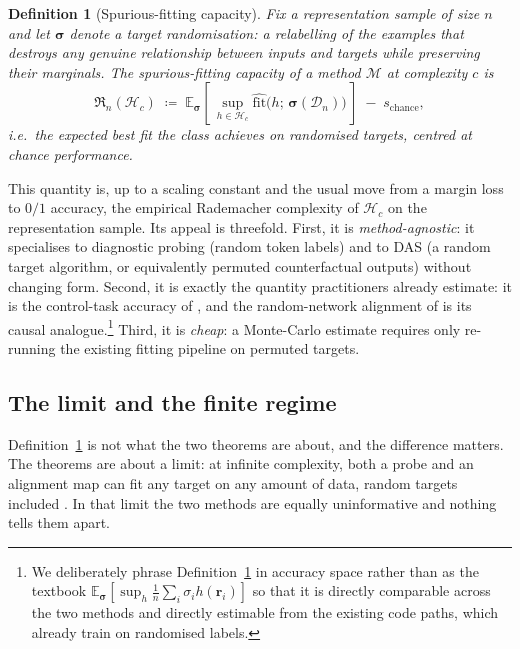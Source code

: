 \documentclass[11pt]{article}
\newtheorem{definition}{Definition}
\newcommand{\rade}{\mathfrak{R}}         %
\newcommand{\hypclass}{\mathcal{H}}      %
\newcommand{\complexity}{c}              %
\newcommand{\fit}{\mathrm{fit}}
\newcommand{\Exp}{\mathbb{E}}
\begin{document}
\begin{definition}[Spurious-fitting capacity]\label{def:capacity}
Fix a representation sample of size $n$ and let $\bm\sigma$ denote a target
\emph{randomisation}: a relabelling of the examples that destroys any genuine
relationship between inputs and targets while preserving their marginals. The
spurious-fitting capacity of a method $\mathcal{M}$ at complexity $\complexity$ is
\begin{equation}\label{eq:capacity}
  \rade_n(\hypclass_{\complexity})
    \;\coloneqq\;
    \Exp_{\bm\sigma}\!\left[\,
      \sup_{h \in \hypclass_{\complexity}}
      \widehat{\fit}\big(h;\, \bm\sigma(\mathcal{D}_n)\big)
    \,\right] \;-\; s_{\mathrm{chance}},
\end{equation}
i.e.\ the expected best fit the class achieves on randomised targets, centred at
chance performance.
\end{definition}

This quantity is, up to a scaling constant and the usual move from a
margin loss to $0/1$ accuracy, the empirical Rademacher complexity of
$\hypclass_{\complexity}$ on the representation sample. Its appeal is threefold.
First, it is \emph{method-agnostic}: it specialises to diagnostic probing (random
token labels) and to DAS (a random target algorithm, or equivalently permuted
counterfactual outputs) without changing form. Second, it is exactly the
quantity practitioners already estimate: it is the control-task accuracy of
\citet{hewitt2019control}, and the random-network alignment of
\citet{sutter2025nonlinear} is its causal analogue.\footnote{We deliberately phrase
Definition~\ref{def:capacity} in accuracy space rather than as the textbook
$\Exp_{\bm\sigma}[\sup_h \frac1n \sum_i \sigma_i h(\mathbf r_i)]$ so that it is
directly comparable across the two methods and directly estimable from the
existing code paths, which already train on randomised labels.} Third, it is
\emph{cheap}: a Monte-Carlo estimate requires only re-running the existing fitting
pipeline on permuted targets.

\subsection{The limit and the finite regime}\label{sec:two-modes}

Definition~\ref{def:capacity} is not what the two theorems are about, and the difference
matters. The theorems are about a limit: at infinite complexity, both a probe and an
alignment map can fit any target on any amount of data, random targets included
\citep[Thm.~1]{pimentel2020information,sutter2025nonlinear}. In that limit the two
methods are equally uninformative and nothing tells them apart.
\end{document}
